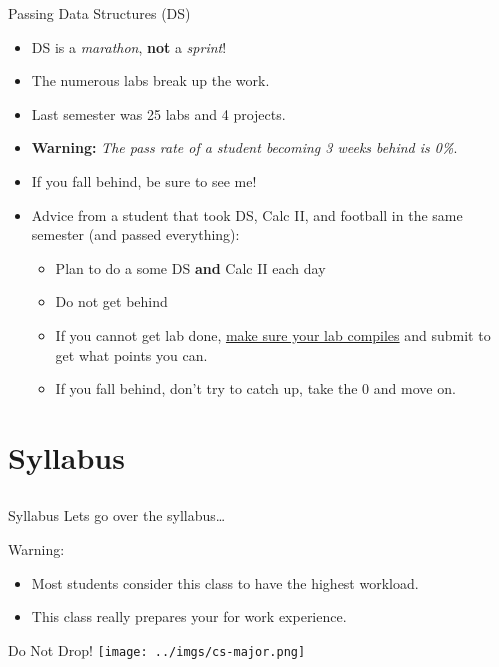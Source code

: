 \documentclass{beamer}
\begin{document}
\begin{frame}{Passing Data Structures (DS)}
\begin{itemize}
\item DS is a \textit{marathon}, \textbf{not} a \textit{sprint}!
\item The numerous labs break up the work.
\item Last semester was 25 labs and 4 projects.
\item \textbf{Warning:} \textit{The pass rate of a student becoming 3 weeks behind is 0\%}.
\item If you fall behind, be sure to see me!
\item Advice from a student that took DS, Calc II, and football in the same semester (and passed everything):
\begin{itemize}
\item Plan to do a some DS \textbf{and} Calc II each day
\item Do not get behind
\item If you cannot get lab done, \underline{make sure your lab compiles} and submit to get what points you can.
\item If you fall behind, don't try to catch up, take the 0 and move on.
\end{itemize}
\end{itemize}
\end{frame}


\section{Syllabus}
\subsection{}

\begin{frame}{Syllabus}
Lets go over the syllabus\ldots
\end{frame}

\begin{frame}{Warning:}
\begin{itemize}
\item Most students consider this class to have the highest workload.
\item This class really prepares your for work experience.
\end{itemize}
\end{frame}

\begin{frame}{Do Not Drop!}
\texttt{[image: ../imgs/cs-major.png]}
\end{frame}
\end{document}
